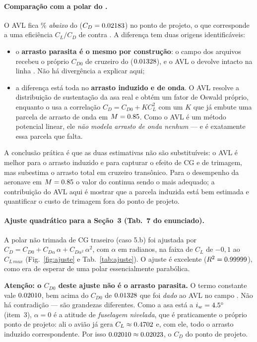 \paragraph{Comparação com a polar do .}
O AVL fica \poDifAbsAftLivre\% \emph{abaixo} do 
($C_D = 0.02183$) no ponto de projeto, o que corresponde a uma eficiência
$C_L/C_D$ de \poEffAftLivre{} contra \poEffDT{}. A diferença tem duas origens
identificáveis:

\begin{itemize}
  \item o \textbf{arrasto parasita é o mesmo por construção}: o campo
   dos arquivos  recebeu o próprio $C_{D0}$ de cruzeiro
  do  ($0.01328$), e o AVL o devolve intacto na linha
  . Não há divergência a explicar aqui;
  \item a diferença está toda no \textbf{arrasto induzido e de onda}. O AVL
  resolve a distribuição de sustentação da asa real e obtém um fator de
  Oswald próprio, enquanto o  usa a correlação
  $C_{D} = C_{D0} + K C_L^{2}$ com um $K$ que já embute uma parcela de arrasto de
  onda em $M = 0.85$. Como o AVL é um método potencial linear, ele
  \emph{não modela arrasto de onda nenhum} --- e é exatamente essa parcela que
  falta.
\end{itemize}

A conclusão prática é que as duas estimativas não são substituíveis: o AVL é
melhor para o arrasto induzido e para capturar o efeito de CG e de trimagem,
mas subestima o arrasto total em cruzeiro transônico. Para o desempenho da
aeronave em $M = 0.85$ o valor do  continua sendo o
mais adequado; a contribuição do AVL aqui é mostrar que a parcela induzida está
bem estimada e quantificar o custo de trimagem fora do ponto de projeto.

\paragraph{Ajuste quadrático para a Seção~3 (Tab.~7 do enunciado).}
A polar não trimada de CG traseiro (caso 5.b) foi ajustada por
$C_D = C_{D0} + C_{D\alpha}\,\alpha + C_{D\alpha^{2}}\,\alpha^{2}$, com $\alpha$
em radianos, na faixa de $C_L$ de $-0{,}1$ ao $C_{L\,max}$
(Fig.~\ref{fig:ajuste} e Tab.~\ref{tab:ajuste}). O ajuste é excelente
($R^{2} = 0.99999$), como era de esperar de uma polar essencialmente
parabólica.

\textbf{Atenção: o $C_{D0}$ deste ajuste não é o arrasto parasita.} O termo
constante vale $0.02010$, bem acima do $C_{D0}$ de $0.01328$ que foi
\emph{dado} ao AVL no campo . Não há contradição --- são grandezas
diferentes. Como a asa está a $i_w = 4.5^\circ$ (item~3), $\alpha = 0$ é a
atitude de \emph{fuselagem nivelada}, que é praticamente o próprio ponto de
projeto: ali o avião já gera $C_L \approx 0.4702$ e, com ele, todo o arrasto
induzido correspondente. Por isso $0.02010 \approx 0.02023$, o $C_D$
do ponto de projeto.

